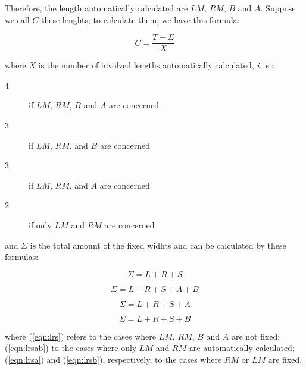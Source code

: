 \documentclass[11pt,a4paper]{article}
\begin{document}
Therefore, the length automatically calculated are $LM$, $RM$, $B$ and $A$. Suppose we call $C$ these lenghts; to calculate them, we have this formula:

\begin{equation}
	C = \frac{T-Σ}{X}
\end{equation}

\noindent{}where $X$ is the number of involved lengths automatically calculated, \textit{i. e.}:

\begin{description}
	\item[4] if $LM$, $RM$, $B$ and $A$ are concerned
	\item[3] if $LM$, $RM$, and $B$ are concerned
	\item[3] if $LM$, $RM$, and $A$ are concerned
	\item[2] if only $LM$ and $RM$ are concerned
\end{description}

\noindent{}and $\Sigma$ is the total amount of the fixed widhts and can be calculated by these formulas:

\begin{equation}
\label{eqn:lrs}
	Σ = L+R+S
\end{equation}

\begin{equation}
\label{eqn:lrsab}
	Σ = L + R + S + A + B
\end{equation}

\begin{equation}
\label{eqn:lrsa}
	Σ = L+R+S+A
\end{equation}

\begin{equation}
\label{eqn:lrsb}
	Σ = L+R+S+B
\end{equation}

\noindent{}where (\ref{eqn:lrs}) refers to the cases where $LM$, $RM$, $B$ and $A$ are not fixed; (\ref{eqn:lrsab}) to the cases where only $LM$ and $RM$ are automatically calculated; (\ref{eqn:lrsa}) and (\ref{eqn:lrsb}), respectively, to the cases where $RM$ or $LM$ are fixed.
\end{document}
